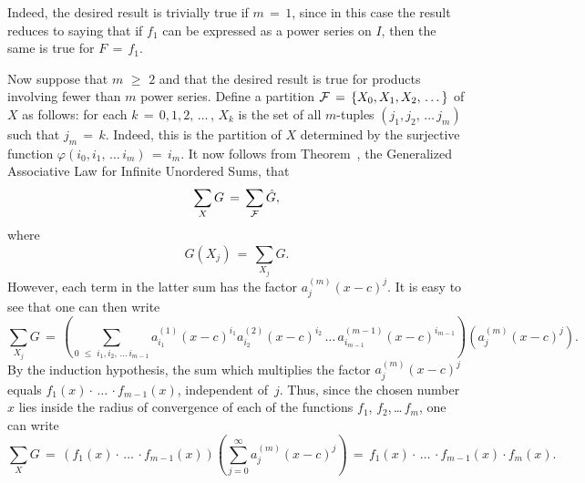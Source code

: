         Indeed, the desired result is trivially true if $m \,=\, 1$, since in this case the result reduces to saying that if $f_{1}$ can be expressed as a power series on $I$, then the same is true for $F \,=\, f_{1}$.

        Now suppose that $m\,\,{\geq}\,\,2$ and that the desired result is true for products involving fewer than $m$ power series.
        Define a partition ${\cal F} \,=\, \{X_{0},X_{1},X_{2},\,{\ldots}\,\}$ of $X$ as follows:
    for each $k \,=\,0, 1,2,\,{\ldots}\,$, $X_{k}$ is the set of all $m$-tuples $(j_{1},j_{2},\,{\ldots}\,j_{m})$ such that $j_{m} \,=\, k$.
    Indeed, this is the partition of $X$ determined by the surjective function ${\varphi}(i_{0},i_{1},\,{\ldots}\,i_{m}) \,=\, i_{m}$.
    It now follows from Theorem~, the Generalized Associative Law for Infinite Unordered Sums, that
        \begin{displaymath}
        \sum_{X} G \,=\, \sum_{{\cal F}} \hat{G},
        \end{displaymath}
    where
        \begin{displaymath}
        \hat{G}(X_{j}) \,=\, \sum_{X_{j}} G.
        \end{displaymath}
    However, each term in the latter sum has the factor $a^{(m)}_{j}(x-c)^{j}$.
    It is easy to see that one can then write
        \begin{displaymath}
        \sum_{X_{j}} G \,=\, \left(\sum_{0\,\,{\leq}\,\,i_{1},i_{2},\,{\ldots}\,i_{m-1}} a^{(1)}_{i_{1}}(x-c)^{i_{1}}a^{(2)}_{i_{2}}(x-c)^{i_{2}}\,{\ldots}\,a^{(m-1)}_{i_{m-1}}(x-c)^{i_{m-1}}\right)(a^{(m)}_{j}(x-c)^{j}).
        \end{displaymath}
    By the induction hypothesis, the sum which multiplies the factor $a^{(m)}_{j}(x-c)^{j}$ equals $f_{1}(x){\cdot}\,{\ldots}\,{\cdot}f_{m-1}(x)$, independent of~$j$.
    Thus, since the chosen number $x$ lies inside the radius of convergence of each of the functions $f_{1}$, $f_{2}$,\,{\ldots}\,$f_{m}$, one can write
        \begin{displaymath}
        \sum_{X} G \,=\, \left(f_{1}(x){\cdot}\,{\ldots}\,{\cdot}f_{m-1}(x)\right)\left(\sum_{j=0}^{{\infty}} a^{(m)}_{j}(x-c)^{j}\right) \,=\, f_{1}(x){\cdot}\,{\ldots}\,{\cdot}f_{m-1}(x){\cdot}f_{m}(x).
        \end{displaymath}

